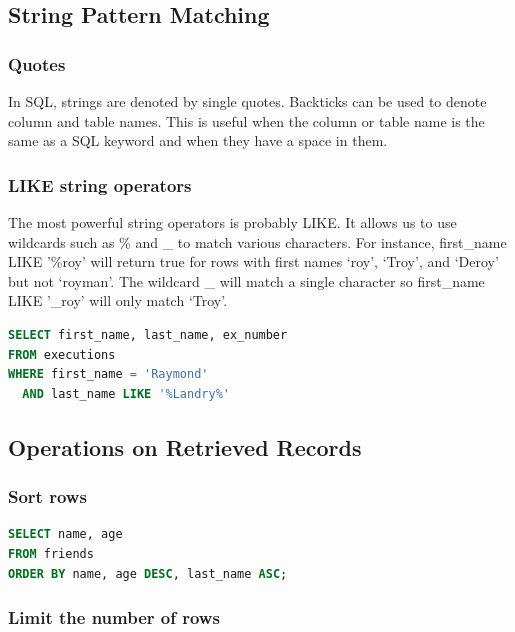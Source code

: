 \documentclass{article}
\begin{document}
\subsection{String Pattern Matching}
\subsubsection{Quotes}

In SQL, strings are denoted by single quotes. Backticks can be used to denote column and table names. This is useful when the column or table name is the same as a SQL keyword and when they have a space in them.

\subsubsection{LIKE string operators}

The most powerful string operators is probably LIKE. It allows us to use wildcards such as \% and \_ to match various characters. For instance, first\_name LIKE '\%roy' will return true for rows with first names ‘roy’, ‘Troy’, and ‘Deroy’ but not ‘royman’. The wildcard \_ will match a single character so first\_name LIKE '\_roy' will only match ‘Troy’.

\vspace{8pt} \begin{lstlisting}[language=SQL]
SELECT first_name, last_name, ex_number
FROM executions
WHERE first_name = 'Raymond'
  AND last_name LIKE '%Landry%'
\end{lstlisting} \vspace{8pt}


\subsection{Operations on Retrieved Records}
\subsubsection{Sort rows}

\vspace{8pt} \begin{lstlisting}[language=SQL]
SELECT name, age
FROM friends
ORDER BY name, age DESC, last_name ASC;
\end{lstlisting} \vspace{8pt}

\subsubsection{Limit the number of rows}
\end{document}
